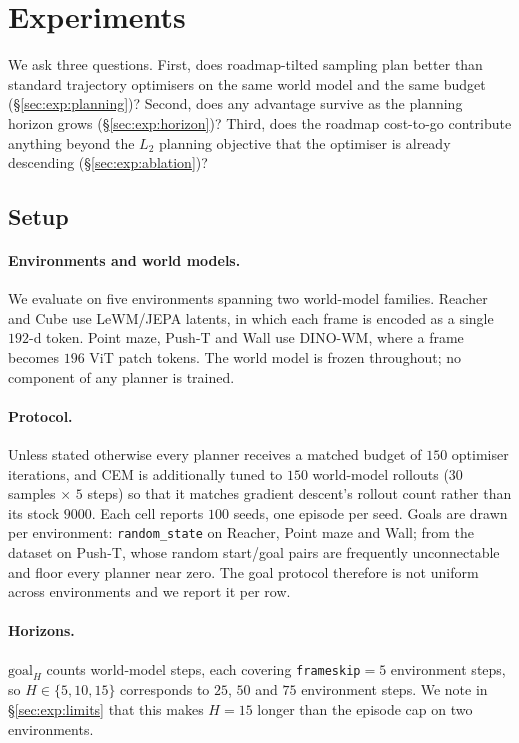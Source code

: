 \section{Experiments}
\label{sec:experiments}

We ask three questions. First, does roadmap-tilted sampling plan better than
standard trajectory optimisers on the same world model and the same budget
(\S\ref{sec:exp:planning})? Second, does any advantage survive as the planning
horizon grows (\S\ref{sec:exp:horizon})? Third, does the roadmap cost-to-go
contribute anything beyond the $L_2$ planning objective that the optimiser is
already descending (\S\ref{sec:exp:ablation})?

\subsection{Setup}
\label{sec:exp:setup}

\paragraph{Environments and world models.}
We evaluate on five environments spanning two world-model families. Reacher and
Cube use LeWM/JEPA latents, in which each frame is encoded as a single $192$-d
token. Point maze, Push-T and Wall use DINO-WM, where a frame becomes $196$ ViT
patch tokens. The world model is frozen throughout; no component of any planner
is trained.

\paragraph{Protocol.}
Unless stated otherwise every planner receives a matched budget of $150$
optimiser iterations, and CEM is additionally tuned to $150$ world-model
rollouts ($30$ samples $\times$ $5$ steps) so that it matches gradient descent's
rollout count rather than its stock $9000$. Each cell reports $100$ seeds, one
episode per seed. Goals are drawn per environment: \texttt{random\_state} on
Reacher, Point maze and Wall; from the dataset on Push-T, whose random
start/goal pairs are frequently unconnectable and floor every planner near
zero. The goal protocol therefore is not uniform across environments and we
report it per row.

\paragraph{Horizons.}
$\mathrm{goal}_H$ counts world-model steps, each covering \texttt{frameskip}$=5$
environment steps, so $H\in\{5,10,15\}$ corresponds to $25$, $50$ and $75$
environment steps. We note in \S\ref{sec:exp:limits} that this makes $H{=}15$
longer than the episode cap on two environments.

